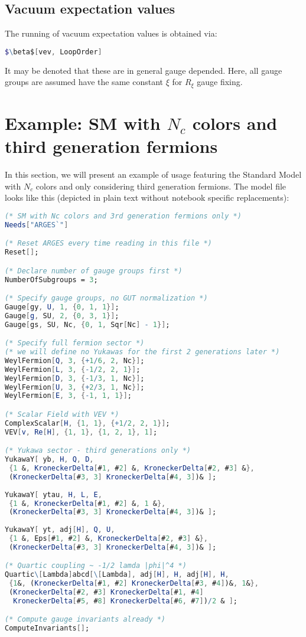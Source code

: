 \documentclass{scrartcl}
\begin{document}
\subsection{Vacuum expectation values}
The running of vacuum expectation values is obtained via:
\begin{lstlisting}[language=mathematica,mathescape,columns=flexible,backgroundcolor=\color{light-gray}]
$\beta$[vev, LoopOrder]
\end{lstlisting}
It may be denoted that these are in general gauge depended. Here, all gauge groups are assumed have the same constant $\xi$ for $R_{\xi}$ gauge fixing.
\newpage
\section{Example: SM with $N_c$ colors and third generation fermions}
In this section, we will present an example of usage featuring the Standard Model with $N_c$ colors and only considering third generation fermions. The model file looks like this (depicted in plain text without notebook specific replacements):
\begin{lstlisting}[language=mathematica,mathescape,columns=flexible,backgroundcolor=\color{light-gray}]
(* SM with Nc colors and 3rd generation fermions only *)
Needs["ARGES`"]

(* Reset ARGES every time reading in this file *)
Reset[];

(* Declare number of gauge groups first *)
NumberOfSubgroups = 3;

(* Specify gauge groups, no GUT normalization *)
Gauge[gy, U, 1, {0, 1, 1}];
Gauge[g, SU, 2, {0, 3, 1}];
Gauge[gs, SU, Nc, {0, 1, Sqr[Nc] - 1}];

(* Specify full fermion sector *)
(* we will define no Yukawas for the first 2 generations later *)
WeylFermion[Q, 3, {+1/6, 2, Nc}];
WeylFermion[L, 3, {-1/2, 2, 1}];
WeylFermion[D, 3, {-1/3, 1, Nc}];
WeylFermion[U, 3, {+2/3, 1, Nc}];
WeylFermion[E, 3, {-1, 1, 1}];

(* Scalar Field with VEV *)
ComplexScalar[H, {1, 1}, {+1/2, 2, 1}];
VEV[v, Re[H], {1, 1}, {1, 2, 1}, 1];

(* Yukawa sector - third generations only *)
YukawaY[ yb, H, Q, D, 
 {1 &, KroneckerDelta[#1, #2] &, KroneckerDelta[#2, #3] &}, 
 (KroneckerDelta[#3, 3] KroneckerDelta[#4, 3])& ];
 
YukawaY[ ytau, H, L, E, 
 {1 &, KroneckerDelta[#1, #2] &, 1 &}, 
 (KroneckerDelta[#3, 3] KroneckerDelta[#4, 3])& ];
 
YukawaY[ yt, adj[H], Q, U, 
 {1 &, Eps[#1, #2] &, KroneckerDelta[#2, #3] &},
 (KroneckerDelta[#3, 3] KroneckerDelta[#4, 3])& ];

(* Quartic coupling ~ -1/2 lamda |phi|^4 *)
Quartic\[Lambda]abcd[\[Lambda], adj[H], H, adj[H], H, 
 {1&, (KroneckerDelta[#1, #2] KroneckerDelta[#3, #4])&, 1&}, 
 (KroneckerDelta[#2, #3] KroneckerDelta[#1, #4] 
  KroneckerDelta[#5, #8] KroneckerDelta[#6, #7])/2 & ];

(* Compute gauge invariants already *)
ComputeInvariants[];
\end{lstlisting}
\end{document}
